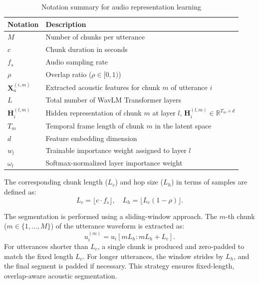 \begin{table}[ht]
	\centering
	\caption{Notation summary for audio representation learning}
	\label{tab:table0}
	\begin{tabular}{|p{} | p{}|}
		\hline
		\textbf{Notation} & \textbf{Description} \\
		\hline
		\hline
		$M$ & Number of chunks per utterance \\
		\hline
		$c$ & Chunk duration in seconds \\
		\hline
		$f_s$ & Audio sampling rate \\
		\hline
		$\rho$ & Overlap ratio ($\rho \in [0, 1)$) \\
		\hline
		$\mathbf{X}_a^{(i,m)}$ & Extracted acoustic features for chunk $m$ of utterance $i$ \\
		\hline
		$L$ & Total number of WavLM Transformer layers \\
		\hline
		$\mathbf{H}_i^{(l, m)}$ & Hidden representation of chunk $m$ at layer $l$, $\mathbf{H}_i^{(l, m)} \in \mathbb{R}^{T_m \times d}$ \\
		\hline
		$T_m$ & Temporal frame length of chunk $m$ in the latent space \\ 
		\hline
		$d$ & Feature embedding dimension \\
		\hline
		$w_l$ & Trainable importance weight assigned to layer $l$ \\
		\hline
		$\omega_l$ & Softmax-normalized layer importance weight \\
		\hline
	\end{tabular}
\end{table}

The corresponding chunk length ($L_c$) and hop size ($L_h$) in terms of samples are defined as: 
\begin{equation}
	L_c = \lfloor c \cdot f_s \rfloor, \quad L_h = \lfloor L_c (1-\rho) \rfloor.
\end{equation}

The segmentation is performed using a sliding-window approach. The $m$-th chunk ($m \in \{1, \dots, M\}$) of the utterance waveform is extracted as:
\begin{equation}
	u_i^{(m)} = u_i[m L_h : m L_h + L_c].
\end{equation}
For utterances shorter than $L_c$, a single chunk is produced and zero-padded to match the fixed length $L_c$. For longer utterances, the window strides by $L_h$, and the final segment is padded if necessary. This strategy ensures fixed-length, overlap-aware acoustic segmentation.

